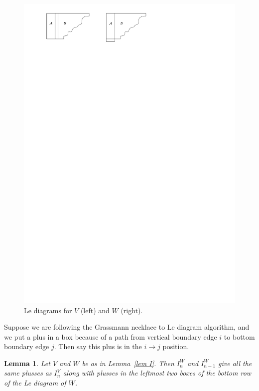 \documentclass[11pt]{article}
\newtheorem{lem}[thm]{Lemma}
\theoremstyle{remark}
\theoremstyle{definition}
\begin{document}
\begin{figure}
  \includegraphics{Le_diagrams}
  \caption{Le diagrams for $V$ (left) and $W$ (right).}\label{fig Le}
\end{figure}

Suppose we are following the Grassmann necklace to Le diagram algorithm, and we put a plus in a box because of a path from vertical boundary edge $i$ to bottom boundary edge $j$.  Then say this plus is in the $i\rightarrow j$ position.

\begin{lem}\label{lem n and n-1}
  Let $V$ and $W$ be as in Lemma~\ref{lem I}.
  Then $I_n^{W}$ and $I_{n-1}^{W}$ give all the same plusses as $I_n^{V}$ along with plusses in the leftmost two boxes of the bottom row of the Le diagram of $W$.
\end{lem}
\end{document}
